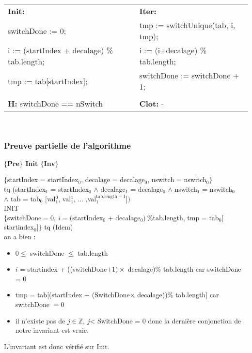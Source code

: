 \noindent \begin{tabular}{ll}
\textbf{Init:} & \textbf{Iter: }\\
switchDone := 0; & tmp := switchUnique(tab, i, tmp);\\
i := (startIndex + decalage) \% tab.length; & i := (i+decalage) \% tab.length;\\
tmp := tab[startIndex]; & switchDone := switchDone + 1;\\
 & \\
\textbf{H:} switchDone == nSwitch & \textbf{Clot: } - \\
\end{tabular}\\

\subsubsection*{Preuve partielle de l'algorithme }
\textbf{$\{$Pre$\}$ Init $\{$Inv$\}$}

$\{$startIndex = startIndex$_{0}$, decalage = decalage$_{0}$, nswitch = nswitch$_{0} \}$\\
tq (startIndex$_{1}$ = startIndex$_{0}$
$\wedge$ decalage$_{1}$ = decalage$_{0}$
$\wedge$ nswitch$_{1}$ = nswitch$_{0}$\\
$\wedge$ tab = tab$_{0}$ $[$val$_{1}^{0}$, val$_{1}^{1}$, ... ,val$_{1}^{\mathrm{tab.length-1}}])$\\

INIT \\

$\{$switchDone$ = 0,\ i = ($startIndex$_0$ + decalage$_0)\ \% $tab.length, tmp = tab$_0[$startindex$_0]\}$ tq (Idem)\\
on a bien : 
\begin{itemize}
	\item $0\leq$ switchDone $\leq$ tab.length
	\item $i$ = startindex + ((switchDone$+1)\times$ decalage)\% tab.length car switchDone = 0
	\item tmp = tab[(startIndex + (SwitchDone$\times$ decalage))\% tab.length] car switchDone $= 0$
	\item il n'existe pas de $j \in \mathbb{Z}$, $j$< SwitchDone = 0 donc la dernière conjonction de notre invariant est vraie. \\
\end{itemize}


L'invariant est donc vérifié sur Init.\\

